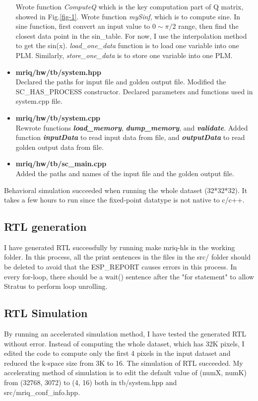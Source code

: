 \documentclass{sig-alternate}
\begin{document}
\begin{itemize}[leftmargin=*]
    Wrote function \textit{ComputeQ} which is the key computation part of Q matrix, showed in Fig.\ref{fig-1}. Wrote function \textit{mySinf}, which is to compute sine. In sine function, first convert an input value to $0\sim \pi/2$ range, then find the closest data point in the sin\_table. For now, I use the interpolation method to get the sin(x). \textit{load\_one\_data} function is to load one variable into one PLM. Similarly, \textit{store\_one\_data} is to store one variable into one PLM.
    \vspace{-2mm}
    \item \textbf{mriq/hw/tb/system.hpp}\\
    Declared the paths for input file and golden output file. Modified the SC\_HAS\_PROCESS constructor. Declared parameters and functions used in system.cpp file.
        \vspace{-2mm}
    \item \textbf{mriq/hw/tb/system.cpp}\\
    Rewrote functions \textbf{\textit{load\_memory}}, \textbf{\textit{dump\_memory}}, and \textbf{\textit{validate}}. Added function \textbf{\textit{inputData}} to read input data from file, and \textbf{\textit{outputData}} to read golden output data from file.
        \vspace{-2mm}
    \item \textbf{mriq/hw/tb/sc\_main.cpp}\\
    Added the paths and names of the input file and the golden output file.
\end{itemize}
Behavioral simulation succeeded when running the whole dataset (32*32*32). It takes a few hours to run since the fixed-point datatype is not native to c/c++. 

\subsection{RTL generation}
I have generated RTL successfully by running make mriq-hls in the working folder. In this process, all the print sentences in the files in the src/ folder should be deleted to avoid that the ESP\_REPORT causes errors in this process. In every for-loop, there should be a wait() sentence after the "for statement" to allow Stratus to perform loop unrolling.

\subsection{RTL Simulation}
By running an accelerated simulation method, I have tested the generated RTL without error. Instead of computing the whole dataset, which has 32K pixels, I edited the code to compute only the first 4 pixels in the input dataset and reduced the k-space size from 3K to 16. The simulation of RTL succeeded. My accelerating method of simulation is to edit the default value of (numX, numK) from (32768, 3072) to (4, 16) both in tb/system.hpp and src/mriq\_conf\_info.hpp. 
\end{document}
